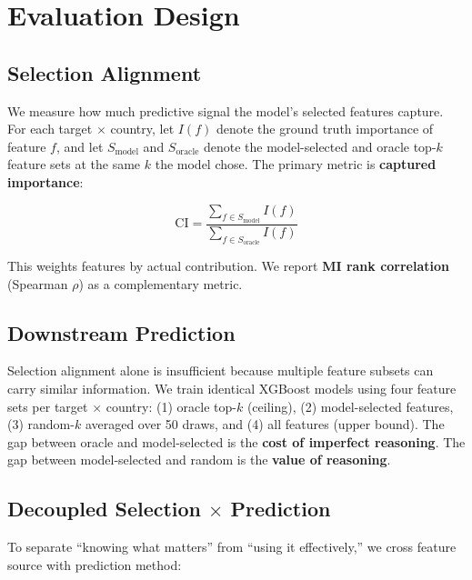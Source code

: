 \documentclass[11pt]{article}
\begin{document}
\section{Evaluation Design}
\label{sec:evaluation}

\subsection{Selection Alignment}

We measure how much predictive signal the model's selected features capture. For each target $\times$ country, let $I(f)$ denote the ground truth importance of feature $f$, and let $S_{\text{model}}$ and $S_{\text{oracle}}$ denote the model-selected and oracle top-$k$ feature sets at the same $k$ the model chose. The primary metric is \textbf{captured importance}:

\begin{equation}
\text{CI} = \frac{\sum_{f \in S_{\text{model}}} I(f)}{\sum_{f \in S_{\text{oracle}}} I(f)}
\end{equation}

This weights features by actual contribution. We report \textbf{MI rank correlation} (Spearman $\rho$) as a complementary metric.

\subsection{Downstream Prediction}

Selection alignment alone is insufficient because multiple feature subsets can carry similar information. We train identical XGBoost models \citep{chen2016xgboost} using four feature sets per target $\times$ country: (1) oracle top-$k$ (ceiling), (2) model-selected features, (3) random-$k$ averaged over 50 draws, and (4) all features (upper bound). The gap between oracle and model-selected is the \textbf{cost of imperfect reasoning}. The gap between model-selected and random is the \textbf{value of reasoning}.

\subsection{Decoupled Selection $\times$ Prediction}
\label{sec:decoupled}

To separate ``knowing what matters'' from ``using it effectively,'' we cross feature source with prediction method:
\end{document}
